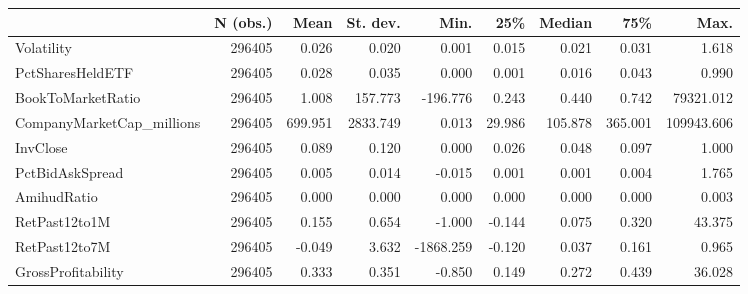 \begin{tabular}{lrrrrrrrr}
\toprule
{} & N (obs.) &    Mean & St. dev. &      Min. &    25\% &  Median &     75\% &       Max. \\
\midrule
Volatility                &   296405 &   0.026 &    0.020 &     0.001 &  0.015 &   0.021 &   0.031 &      1.618 \\
PctSharesHeldETF          &   296405 &   0.028 &    0.035 &     0.000 &  0.001 &   0.016 &   0.043 &      0.990 \\
BookToMarketRatio         &   296405 &   1.008 &  157.773 &  -196.776 &  0.243 &   0.440 &   0.742 &  79321.012 \\
CompanyMarketCap\_millions &   296405 & 699.951 & 2833.749 &     0.013 & 29.986 & 105.878 & 365.001 & 109943.606 \\
InvClose                  &   296405 &   0.089 &    0.120 &     0.000 &  0.026 &   0.048 &   0.097 &      1.000 \\
PctBidAskSpread           &   296405 &   0.005 &    0.014 &    -0.015 &  0.001 &   0.001 &   0.004 &      1.765 \\
AmihudRatio               &   296405 &   0.000 &    0.000 &     0.000 &  0.000 &   0.000 &   0.000 &      0.003 \\
RetPast12to1M             &   296405 &   0.155 &    0.654 &    -1.000 & -0.144 &   0.075 &   0.320 &     43.375 \\
RetPast12to7M             &   296405 &  -0.049 &    3.632 & -1868.259 & -0.120 &   0.037 &   0.161 &      0.965 \\
GrossProfitability        &   296405 &   0.333 &    0.351 &    -0.850 &  0.149 &   0.272 &   0.439 &     36.028 \\
\bottomrule
\end{tabular}
